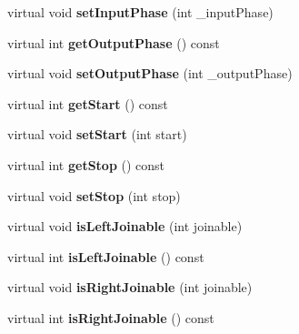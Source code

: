 \begin{DoxyCompactItemize}
virtual void {\bfseries set\+Input\+Phase} (int \+\_\+input\+Phase)
\item 
\mbox{\label{classtops_1_1GHMMState_ae265b35c0f29e8f9e5dc26c20490643e}} 
virtual int {\bfseries get\+Output\+Phase} () const
\item 
\mbox{\label{classtops_1_1GHMMState_a83310d7c4cafe023ae12ea7e8ec52a4f}} 
virtual void {\bfseries set\+Output\+Phase} (int \+\_\+output\+Phase)
\item 
\mbox{\label{classtops_1_1GHMMState_a88c726adf531df277ee23ed3bdecdabe}} 
virtual int {\bfseries get\+Start} () const
\item 
\mbox{\label{classtops_1_1GHMMState_a3fc74623c2cafc82390619508998fd60}} 
virtual void {\bfseries set\+Start} (int start)
\item 
\mbox{\label{classtops_1_1GHMMState_ac50009adb860a78432ed14fb1f83ba60}} 
virtual int {\bfseries get\+Stop} () const
\item 
\mbox{\label{classtops_1_1GHMMState_a16e51ba0cf3426ac5de1c739fcd1f3f6}} 
virtual void {\bfseries set\+Stop} (int stop)
\item 
\mbox{\label{classtops_1_1GHMMState_aba4facd57e95105b2f997082befd672b}} 
virtual void {\bfseries is\+Left\+Joinable} (int joinable)
\item 
\mbox{\label{classtops_1_1GHMMState_a428a59b0f6958382d34b1e6323b2aa8e}} 
virtual int {\bfseries is\+Left\+Joinable} () const
\item 
\mbox{\label{classtops_1_1GHMMState_a6b3ecb6bd87412895604c7f8cda87d10}} 
virtual void {\bfseries is\+Right\+Joinable} (int joinable)
\item 
\mbox{\label{classtops_1_1GHMMState_a9686860dee6c78bcb24c5b61214a8bec}} 
virtual int {\bfseries is\+Right\+Joinable} () const
\item 
\mbox{\label{classtops_1_1GHMMState_ae0545d894a03b676faaf4170af2e4b54}} 

\end{DoxyCompactItemize}
